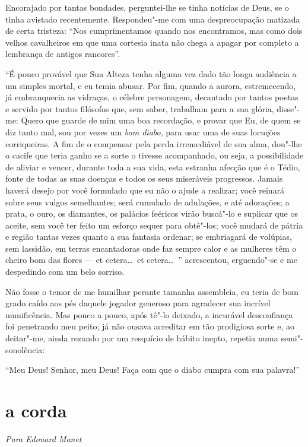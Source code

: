 Encorajado por tantas bondades, perguntei-lhe se tinha notícias de
Deus, se o tinha avistado recentemente. Respondeu"-me com uma
despreocupação matizada de certa tristeza: “Nos
cumprimentamos quando nos encontramos, mas como dois velhos
cavalheiros em que uma cortesia inata não chega a apagar
por completo a lembrança de antigos rancores''.

“É pouco provável que Sua Alteza tenha alguma vez dado tão longa
audiência a um simples mortal, e eu temia abusar. Por fim, quando a
aurora, estremecendo, já embranquecia as vidraças, o célebre
personagem, decantado por tantos poetas e servido por tantos filósofos
que, sem saber, trabalham para a sua glória, disse"-me: Quero
que guarde de mim uma boa recordação, e provar que Eu, de
quem se diz tanto mal, sou por vezes um \textit{bom diabo}, para usar uma de
suas locuções corriqueiras. A fim de o compensar pela perda
irremediável de sua alma, dou"-lhe o cacife que teria ganho se a
sorte o tivesse acompanhado, ou seja, a possibilidade de aliviar e 
vencer, durante toda a sua vida, esta estranha afecção que é o Tédio,
fonte de todas as suas doenças e todos os seus miseráveis progressos.
Jamais haverá desejo por você formulado que eu não o ajude a realizar;
você reinará sobre seus vulgos semelhantes; será cumulado de
adulações, e até adorações; a prata, o ouro, os diamantes, os
palácios feéricos virão buscá"-lo e suplicar que os aceite, sem
você ter feito um esforço sequer para obtê"-los; você mudará de
pátria e região tantas vezes quanto a sua fantasia ordenar; se
embriagará de volúpias, sem lassidão, em terras encantadoras onde faz
sempre calor e as mulheres têm o cheiro bom das flores
--- et cetera\ldots\  et cetera\ldots\ '' acrescentou, erguendo"-se e
me despedindo com um belo sorriso.

Não fosse o temor de me humilhar perante tamanha assembleia, eu teria
de bom grado caído aos pés daquele jogador generoso para agradecer
sua incrível munificência. Mas pouco a pouco, após tê"-lo deixado, a
incurável desconfiança foi penetrando meu peito; já não ousava acreditar em
tão prodigiosa sorte e, ao deitar"-me, ainda rezando por um
resquício de hábito inepto, repetia numa semi"-sonolência:

“Meu Deus! Senhor, meu Deus! Faça com que o diabo cumpra
com sua palavra!''

\quebra\section[A corda]{a corda}
\begin{flushright}
\textit{Para Edouard Manet}
\end{flushright}

